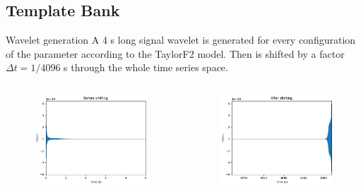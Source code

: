 \documentclass[
10pt,
aspectratio=169,
]{beamer}
\begin{document}
\subsection{Template Bank}
\begin{frame}{Wavelet generation}
A 4 s long signal wavelet is generated for every configuration of the parameter according to the TaylorF2 model. Then is shifted by a factor $\Delta t = 1/4096 $ s through the whole time series space.
\begin{columns}
    \begin{figure}
        \centering
        \includegraphics[width=\columnwidth]{before_F2.png}
    \end{figure}
        \begin{figure}
        \centering
        \includegraphics[width=\columnwidth]{after_F2.png}
    \end{figure}
\end{columns}

\end{frame}
\end{document}
